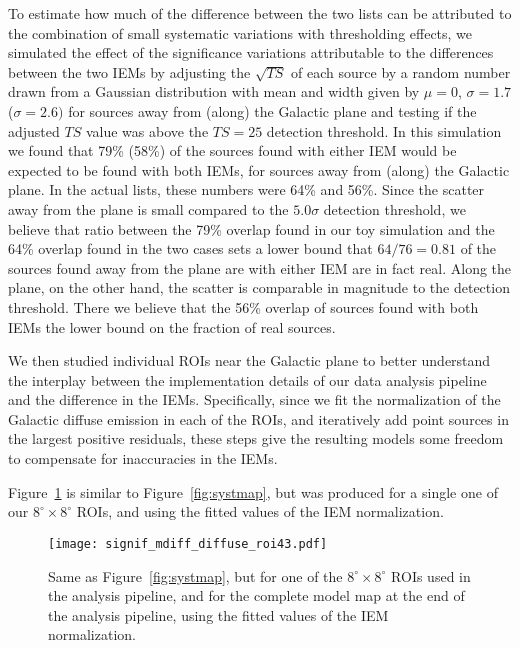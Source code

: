 \documentclass[iop]{emulateapj}
\begin{document}
To estimate how much of the difference between the two lists
  can be attributed to the combination of small systematic variations
  with thresholding effects, we simulated the effect of the
  significance variations attributable to the differences between the two IEMs by adjusting the
  $\sqrt{TS}$ of each source by a random number drawn from a Gaussian
  distribution with mean and width given by $\mu = 0$, $\sigma=1.7$
  ($\sigma=2.6)$ for sources away from (along) the Galactic plane and
  testing if the adjusted $TS$ value was above the $TS = 25$ detection
  threshold.  In this simulation we found that 79\% (58\%) of the
  sources found with either IEM would be expected to be found with
  both IEMs, for sources away from (along) the Galactic plane.  
  In the actual lists, these numbers were 64\% and 56\%.  Since
  the scatter away from the plane is small compared to the $5.0\sigma$
  detection threshold, we believe that ratio between the 79\%
  overlap found in our toy simulation and the 64\% overlap found in
  the two cases sets a lower bound that $64/76 = 0.81$ of the sources
  found away from the plane are with either IEM are in fact real. 
  Along the plane, on the other hand, the scatter is comparable in
  magnitude to the detection threshold.  There we believe that the 
  56\% overlap of sources found with both IEMs the lower bound
  on the fraction of real sources.

We then studied individual ROIs near the Galactic plane 
  to better understand the interplay between the implementation details
  of our data analysis pipeline and the difference in the IEMs.  Specifically, 
  since we fit the normalization of the Galactic diffuse emission
  in each of the ROIs, and iteratively add point sources 
  in the largest positive residuals, these steps give the resulting
  models some freedom to compensate for inaccuracies in the IEMs.

Figure~\ref{fig:systmap_roi43} is similar to Figure~\ref{fig:systmap}, 
  but was produced for a single one of our $8^{\circ}\times8^{\circ}$ ROIs, and 
  using the fitted values of the IEM normalization.

\begin{figure}[!ht]
  \centering
\texttt{[image: signif\_mdiff\_diffuse\_roi43.pdf]}
\caption{Same as Figure~\ref{fig:systmap}, but for one of the $8^{\circ}\times8^{\circ}$
  ROIs used in the analysis pipeline, and for the complete model map at the
  end of the analysis pipeline, using the fitted values of the IEM normalization.}
\label{fig:systmap_roi43} 
\end{figure}
\end{document}
